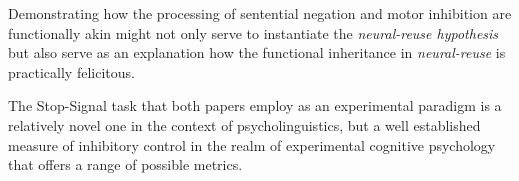 
Demonstrating how the processing of sentential negation and motor inhibition
are functionally akin might not only serve to instantiate the
\textit{neural-reuse hypothesis} but also serve as an explanation how the
functional inheritance in \textit{neural-reuse} is practically felicitous.



The Stop-Signal task that both papers employ as an experimental paradigm is
a relatively novel one in the context of psycholinguistics, but a well
established measure of inhibitory control in the realm of experimental
cognitive psychology that offers a range of possible metrics.\\

